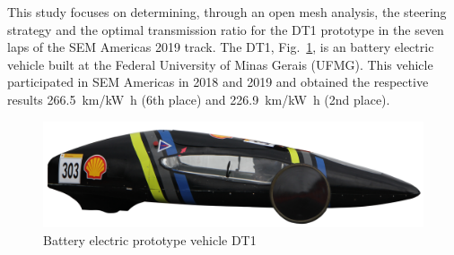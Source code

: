 This study focuses on determining, through an open mesh analysis, the steering strategy and the optimal transmission ratio for the DT1 prototype in the seven laps of the SEM Americas 2019 track. 
The DT1, Fig.~\ref{fig1}, is an battery electric vehicle built at the Federal University of Minas Gerais (UFMG).
This vehicle participated in SEM Americas in 2018 and 2019 and obtained the respective results \SI{266.5}{km/kW.h} (6th place) and \SI{226.9}{km/kW.h} (2nd place).  

\begin{figure}[h!]
    \centering
    \includegraphics[angle=0, scale=0.8]{1_Introducao/Figuras/dt1.png}
    \caption{Battery electric prototype vehicle DT1}
    \label{fig1}
\end{figure}


